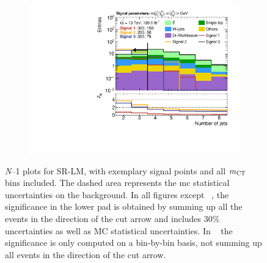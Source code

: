 \begin{figure}
	\begin{subfigure}[b]{0.45\linewidth}
		\centering\includegraphics[width=\textwidth]{n1_SRLM_mct_bins/nJet30.pdf}
		\vspace{-2em}
		\caption{\label{fig:Wh_reopt_second_round_n1_srlm_njet}}
	\end{subfigure}
	\caption{\textit{N}--1 plots for SR-LM, with exemplary signal points and all $m_{\textrm{CT}}$ bins included. The dashed area represents the \gls{mc} statistical uncertainties on the background. In all figures except \figname~, the significance in the lower pad is obtained by summing up all the events in the direction of the cut arrow and includes 30\% uncertainties as well as MC statistical uncertainties. In \figname~ the significance is only computed on a bin-by-bin basis, \ie not summing up all events in the direction of the cut arrow.}
	\label{fig:Wh_reopt_second_round_n1_srlm}
\end{figure}

